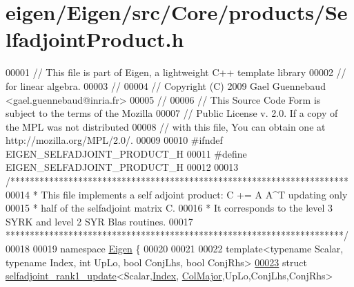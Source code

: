 \hypertarget{eigen_2_eigen_2src_2_core_2products_2_selfadjoint_product_8h_source}{}\section{eigen/\+Eigen/src/\+Core/products/\+Selfadjoint\+Product.h}
\label{eigen_2_eigen_2src_2_core_2products_2_selfadjoint_product_8h_source}

\begin{DoxyCode}
00001 \textcolor{comment}{// This file is part of Eigen, a lightweight C++ template library}
00002 \textcolor{comment}{// for linear algebra.}
00003 \textcolor{comment}{//}
00004 \textcolor{comment}{// Copyright (C) 2009 Gael Guennebaud <gael.guennebaud@inria.fr>}
00005 \textcolor{comment}{//}
00006 \textcolor{comment}{// This Source Code Form is subject to the terms of the Mozilla}
00007 \textcolor{comment}{// Public License v. 2.0. If a copy of the MPL was not distributed}
00008 \textcolor{comment}{// with this file, You can obtain one at http://mozilla.org/MPL/2.0/.}
00009 
00010 \textcolor{preprocessor}{#ifndef EIGEN\_SELFADJOINT\_PRODUCT\_H}
00011 \textcolor{preprocessor}{#define EIGEN\_SELFADJOINT\_PRODUCT\_H}
00012 
00013 \textcolor{comment}{/**********************************************************************}
00014 \textcolor{comment}{* This file implements a self adjoint product: C += A A^T updating only}
00015 \textcolor{comment}{* half of the selfadjoint matrix C.}
00016 \textcolor{comment}{* It corresponds to the level 3 SYRK and level 2 SYR Blas routines.}
00017 \textcolor{comment}{**********************************************************************/}
00018 
00019 \textcolor{keyword}{namespace }\hyperlink{namespace_eigen}{Eigen} \{ 
00020 
00021 
00022 \textcolor{keyword}{template}<\textcolor{keyword}{typename} Scalar, \textcolor{keyword}{typename} Index, \textcolor{keywordtype}{int} UpLo, \textcolor{keywordtype}{bool} ConjLhs, \textcolor{keywordtype}{bool} ConjRhs>
\hyperlink{struct_eigen_1_1selfadjoint__rank1__update_3_01_scalar_00_01_index_00_01_col_major_00_01_up_lo_0985162e7429113fdcd7a3950b8d00f1e}{00023} \textcolor{keyword}{struct }\hyperlink{struct_eigen_1_1selfadjoint__rank1__update}{selfadjoint\_rank1\_update}<Scalar,\hyperlink{namespace_eigen_a62e77e0933482dafde8fe197d9a2cfde}{Index},
      \hyperlink{group__enums_ggaacded1a18ae58b0f554751f6cdf9eb13a0cbd4bdd0abcfc0224c5fcb5e4f6669a}{ColMajor},UpLo,ConjLhs,ConjRhs>

\end{DoxyCode}
